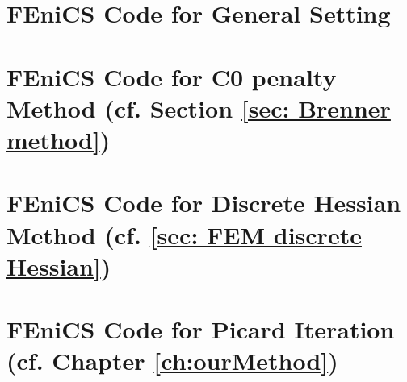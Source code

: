 \section{FEniCS Code for General Setting}


\section{FEniCS Code for C0 penalty Method (cf. Section \ref{sec: Brenner method})} \label{app: Code Brenner}

\section{FEniCS Code for Discrete Hessian Method (cf. \ref{sec: FEM discrete Hessian})} \label{app: Code Neilan}


\section{FEniCS Code for Picard Iteration (cf. Chapter \ref{ch:ourMethod})} \label{app: our code}


